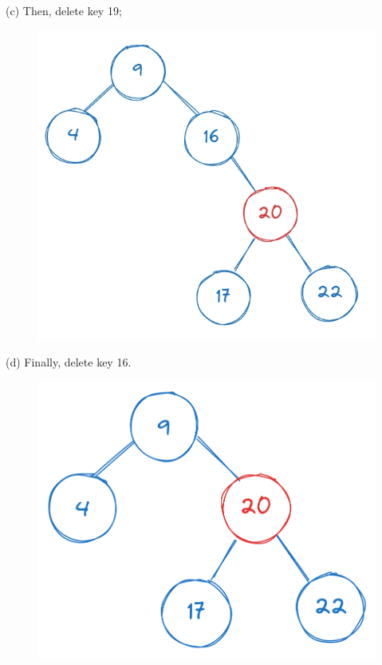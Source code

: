 \vspace{10pt}
\noindent \begin{minipage}{0.5\textwidth}
(c) Then, delete key 19;
\begin{figure}[H]
    \centering
    \includegraphics[width=0.8\linewidth]{HWs/HW6/figures/4-4.png}
\end{figure}
\end{minipage}
\begin{minipage}{0.5\textwidth}
(d) Finally, delete key 16.
\begin{figure}[H]
    \centering
    \includegraphics[width=0.6\linewidth]{HWs/HW6/figures/4-5.png}
\end{figure}
\end{minipage}



